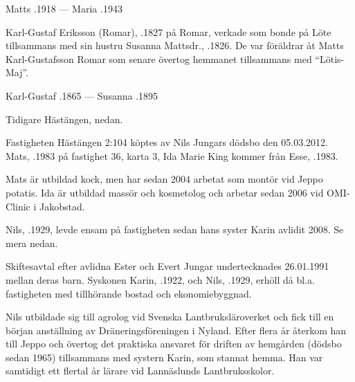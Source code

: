 Matts .1918  ---  Maria .1943


Karl-Gustaf Eriksson (Romar), .1827 på Romar, verkade som bonde på Löte tillsammans med sin hustru Susanna Mattsdr., .1826. De var föräldrar åt Matts Karl-Gustafsson Romar som senare övertog hemmanet tillsammans med ``Lötis-Maj''.

Karl-Gustaf .1865  ---  Susanna .1895



Tidigare Hästängen, nedan.



Fastigheten Hästängen 2:104 köptes av Nils Jungars dödsbo den 05.03.2012. Mats, .1983 på fastighet 36, karta 3, Ida Marie King kommer från Esse, .1983.

Mats är utbildad kock, men har sedan 2004 arbetat som montör vid Jeppo potatis. Ida är utbildad massör och kosmetolog och arbetar sedan 2006 vid OMI-Clinic i Jakobstad.
\begin{jhchildren}
  \item {}
  \item {}
  \item {}
\end{jhchildren}


Nils, .1929, levde ensam på fastigheten sedan hans syster Karin avlidit 2008. Se mera nedan.


Skiftesavtal efter avlidna Ester och Evert Jungar undertecknades 26.01.1991 mellan deras barn. Syskonen Karin, .1922, och Nils, .1929, erhöll då bl.a. fastigheten med tillhörande bostad och ekonomiebyggnad.

Nils utbildade sig till agrolog vid Svenska Lantbruksläroverket och fick till en början anställning av Dräneringsföreningen i Nyland. Efter flera år återkom han till Jeppo och övertog det praktiska ansvaret för driften av hemgården (dödsbo sedan 1965) tillsammans med systern Karin, som stannat hemma. Han var samtidigt ett flertal år lärare vid Lannäslunds Lantbruksskolor.


